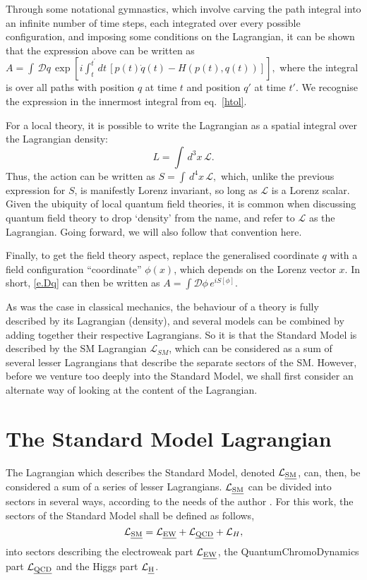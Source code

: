 Through some notational gymnastics, which involve carving the path integral into an infinite number of time steps, each integrated over every possible configuration, and imposing some conditions on the Lagrangian, it can be shown \cite{srednicki} that the expression above can be written as
\(A=\int\,\mathcal Dq\,\exp\left[i\int_t^{t^\prime}dt\,[p(t)\dot q(t)-H(p(t),q(t))]\right],\label{e.Dq}\)
where the integral is over all paths with position $q$ at time $t$ and position $q\prime$ at time $t\prime$. We recognise the expression in the innermost integral from eq.~\eqref{htol}.

For a local theory, it is possible to write the Lagrangian as a spatial integral over the Lagrangian density:
\[L=\int \,d^3x\,\mathcal L.\]
Thus, the action can be written as
\(S=\int\,d^4x\,\mathcal L,\label{e.S}\)
which, unlike the previous expression for $S$, is manifestly Lorenz invariant, so long as $\mathcal L$ is a Lorenz scalar. Given the ubiquity of local quantum field theories, it is common when discussing quantum field theory to drop `density' from the name, and refer to $\mathcal L$ as the Lagrangian. Going forward, we will also follow that convention here.

Finally, to get the field theory aspect, replace the generalised coordinate $q$ with a field configuration ``coordinate'' $\phi(x)$, which depends on the Lorenz vector $x$. In short, \eqref{e.Dq} can then be written as
\(A=\int\mathcal D\phi\, e^{iS[\phi]}.\label{e.Dphi}\)

As was the case in classical mechanics, the behaviour of a theory is fully described by its Lagrangian (density), and several models can be combined by adding together their respective Lagrangians. So it is that the Standard Model is described by the SM Lagrangian $\mathcal L_{SM}$, which can be considered as a sum of several lesser Lagrangians that describe the separate sectors of the SM. However, before we venture too deeply into the Standard Model, we shall first consider an alternate way of looking at the content of the Lagrangian.

\section{The Standard Model Lagrangian}

The Lagrangian which describes the Standard Model, denoted $\mathcal{L}_{\text{\emph{SM}}}$, can, then, be considered a sum of a series of lesser Lagrangians. $\mathcal{L}_{\text{\emph{SM}}}$ can be divided into sectors in several ways, according to the needs of the author \cite{srednicki,wikism}. For this work, the sectors of the Standard Model shall be defined as follows,
\[\mathcal{L}_{\text{\emph{SM}}}=\mathcal{L}_{\text{\emph{EW}}}+\mathcal{L}_{\text{\emph{QCD}}}+\mathcal{L}_{H},\]
into sectors describing the electroweak part $\mathcal{L}_{\text{\emph{EW}}}$, the QuantumChromoDynamics part $\mathcal{L}_{\text{\emph{QCD}}}$ and the Higgs part $\mathcal{L}_{\text{\emph{H}}}$.

